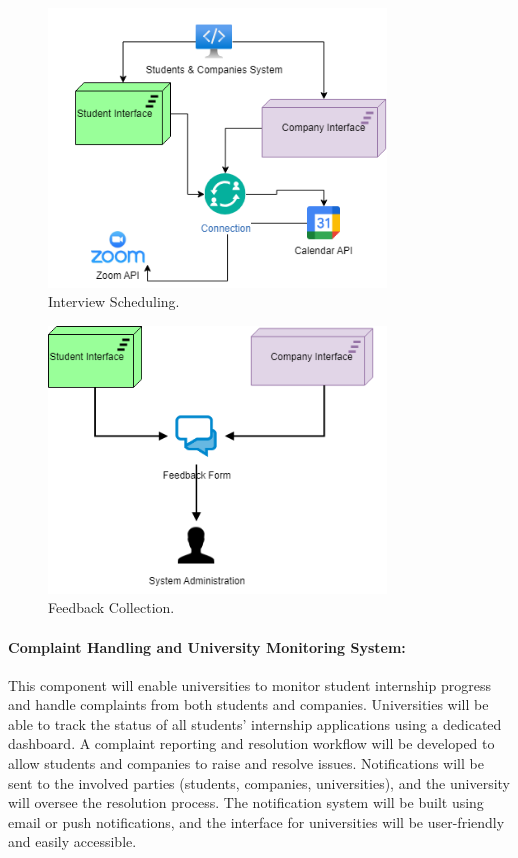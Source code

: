 \begin{figure}[H]
\centering
\includegraphics[width=0.8\textwidth]{Images/core42.png}
\caption{Interview Scheduling.}
\end{figure}
\begin{figure}[H]
\centering
\includegraphics[width=0.8\textwidth]{Images/core41.png}
\caption{Feedback Collection.}
\end{figure}

\paragraph{Complaint Handling and University Monitoring System:}
This component will enable universities to monitor student internship progress and handle complaints from both students and companies. Universities will be able to track the status of all students' internship applications using a dedicated dashboard. A complaint reporting and resolution workflow will be developed to allow students and companies to raise and resolve issues. Notifications will be sent to the involved parties (students, companies, universities), and the university will oversee the resolution process. The notification system will be built using email or push notifications, and the interface for universities will be user-friendly and easily accessible.

